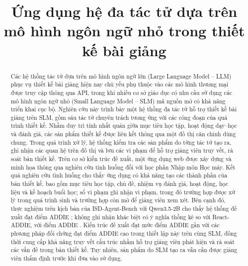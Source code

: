 \documentclass[conference,a4paper]{IEEEtran}
\begin{document}
\title{Ứng dụng hệ đa tác tử dựa trên\\
mô hình ngôn ngữ nhỏ trong thiết kế bài giảng}

\author{
}

\maketitle

\begin{abstract}
Các hệ thống tác tử dựa trên mô hình ngôn ngữ lớn (Large Language Model -- LLM) phục vụ thiết kế
bài giảng hiện nay chủ yếu phụ thuộc vào các mô hình thương mại được truy cập thông qua API, trong
khi nhiều cơ sở giáo dục có nhu cầu sử dụng các mô hình ngôn ngữ nhỏ (Small Language Model -- SLM)
mã nguồn mở có khả năng triển khai cục bộ. Nghiên cứu này trình bày một hệ thống đa tác tử hỗ trợ
thiết kế bài giảng trên SLM, gồm sáu tác tử chuyên trách tương ứng với các công đoạn của quá trình
thiết kế. Nhằm duy trì tính nhất quán giữa mục tiêu học tập, hoạt động dạy--học và đánh giá, các
sản phẩm thiết kế được liên kết thông qua một đồ thị căn chỉnh dùng chung. Trong quá trình xử lý, hệ
thống kiểm tra các sản phẩm do từng tác tử tạo ra, ghi nhận các quan hệ trên đồ thị và lưu các vi
phạm để hỗ trợ giảng viên truy vết, rà soát bản thiết kế. Trên cơ sở kiến trúc đề xuất, một ứng
dụng web được xây dựng và minh họa thông qua nghiên cứu tình huống đối với học phần Nhập môn Học
máy. Kết quả nghiên cứu tình huống cho thấy ứng dụng có khả năng tạo các thành phần của bản thiết
kế, bao gồm mục tiêu học tập, chủ đề, nhiệm vụ đánh giá, hoạt động, học liệu và kế hoạch buổi học;
sổ vi phạm ghi nhận \caseViol{} vi phạm, trong đó \caseViolAgent{} trường hợp được xử lý trong quá
trình sinh và \caseViolOpen{} trường hợp còn mở để giảng viên xem xét. Bên cạnh đó, thực nghiệm
trên \NScen{} kịch bản của ISD-Agent-Bench với Qwen3.5-2B cho thấy hệ thống đề xuất đạt điểm ADDIE
\cmpAGAddie; không ghi nhận khác biệt có ý nghĩa thống kê so với React-ADDIE, với điểm ADDIE
\cmpReactAddie. Kiến trúc đề xuất đạt mức điểm ADDIE gần với các phương pháp đối chứng
đạt điểm ADDIE cao trong thiết lập này trên cùng SLM, đồng thời cung cấp khả năng truy vết cấu trúc nhằm hỗ
trợ giảng viên phát hiện và rà soát các vấn đề trong bản thiết kế. Tuy nhiên, sản phẩm do SLM tạo
ra vẫn cần được giảng viên thẩm định trước khi đưa vào sử dụng.
\end{abstract}
\end{document}
